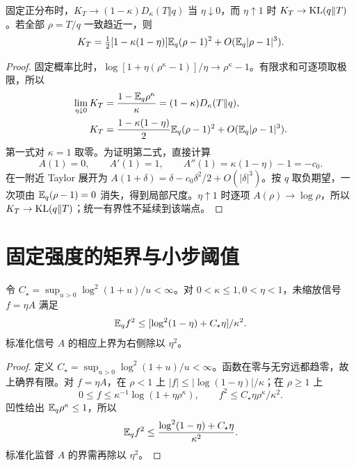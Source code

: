 \begin{proposition}[中心的端点与局部尺度]
固定正分布时，$K_T\to(1-\kappa)D_\kappa(T\Vert q)$ 当 $\eta\downarrow0$，而 $\eta\uparrow1$ 时 $K_T\to\operatorname{KL}(q\Vert T)$。若全部 $\rho=T/q$ 一致趋近一，则
\begin{equation}
K_T=\tfrac12[1-\kappa(1-\eta)]\mathbb E_q(\rho-1)^2+O(\mathbb E_q|\rho-1|^3).
\end{equation}
\end{proposition}
\begin{proof}
固定概率比时，$\log[1+\eta(\rho^\kappa-1)]/\eta\to\rho^\kappa-1$。有限求和可逐项取极限，所以
\begin{align}
\lim_{\eta\downarrow0}K_T
&=\frac{1-\mathbb E_q\rho^\kappa}{\kappa}=(1-\kappa)D_\kappa(T\Vert q),\\
K_T&=\frac{1-\kappa(1-\eta)}2\mathbb E_q(\rho-1)^2
+O(\mathbb E_q|\rho-1|^3).
\end{align}
第一式对 $\kappa=1$ 取零。为证明第二式，直接计算
\begin{equation}
A(1)=0,\qquad A'(1)=1,\qquad A''(1)=\kappa(1-\eta)-1=-c_0.
\end{equation}
在一附近 Taylor 展开为 $A(1+\delta)=\delta-c_0\delta^2/2+O(|\delta|^3)$。按 $q$ 取负期望，一次项由 $\mathbb E_q(\rho-1)=0$ 消失，得到局部尺度。$\eta\uparrow1$ 时逐项 $A(\rho)\to\log\rho$，所以 $K_T\to\operatorname{KL}(q\Vert T)$；统一有界性不延续到该端点。
\end{proof}

\section{固定强度的矩界与小步阈值}
\begin{proposition}[固定强度的维数无关二阶矩界]
令 $C_\star=\sup_{u>0}\log^2(1+u)/u<\infty$。对 $0<\kappa\le1,0<\eta<1$，未缩放信号 $f=\eta A$ 满足
\begin{equation}
\mathbb E_qf^2\le[\log^2(1-\eta)+C_\star\eta]/\kappa^2.
\end{equation}
标准化信号 $A$ 的相应上界为右侧除以 $\eta^2$。
\end{proposition}
\begin{proof}
定义 $C_\star=\sup_{u>0}\log^2(1+u)/u<\infty$。函数在零与无穷远都趋零，故上确界有限。对 $f=\eta A$，在 $\rho<1$ 上 $|f|\le|\log(1-\eta)|/\kappa$；在 $\rho\ge1$ 上
\begin{equation}
0\le f\le\kappa^{-1}\log(1+\eta\rho^\kappa),\qquad
f^2\le C_\star\eta\rho^\kappa/\kappa^2.
\end{equation}
凹性给出 $\mathbb E_q\rho^\kappa\le1$，所以
\begin{equation}
\mathbb E_qf^2\le\frac{\log^2(1-\eta)+C_\star\eta}{\kappa^2}.
\label{eq:raw-moment}
\end{equation}
标准化监督 $A$ 的界需再除以 $\eta^2$。
\end{proof}

